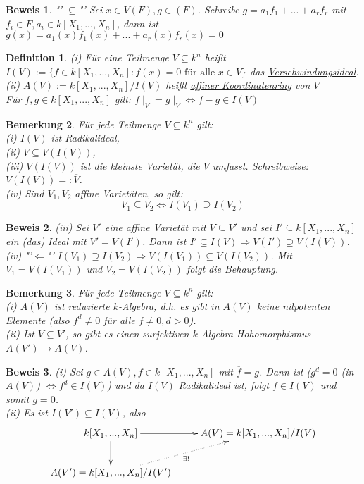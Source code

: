 \documentclass[a4paper,12pt]{report}
\theoremstyle{break}
\newtheorem{Def}{Definition}[chapter]
\newtheorem{Bem}[Def]{Bemerkung}
\theoremstyle{nonumberbreak}
\newtheorem{Bew}{Beweis}
\theoremstyle{nonumberplain}
\begin{document}
\begin{Bew}
"' $\subseteq$"' Sei $x\in V(F), g\in (F)$. Schreibe $g=a_1f_1+...+a_rf_r$ mit $f_i \in F, a_i \in k[X_1,...,X_n]$, dann ist $g(x)=a_1(x)f_1(x)+...+a_r(x)f_r(x)=0$
\end{Bew}
\begin{Def}
(i) Für eine Teilmenge $V\subseteq k^n$ heißt
$I(V):=\{f\in k[X_1,...,X_n]: f(x)=0 \text{ für alle } x \in V\}$
das \underline{Verschwindungsideal}.\\
(ii) $A(V):= k[X_1,...,X_n]/I(V)$ heißt \underline{affiner Koordinatenring} von $V$\\
Für $f,g\in k[X_1,...,X_n]$ gilt: $f\mid_V = g\mid_V\Leftrightarrow f-g \in I(V)$
\end{Def}
\begin{Bem}
Für jede Teilmenge $V\subseteq k^n$ gilt:\\
(i) $I(V)$ ist Radikalideal,\\
(ii) $V\subseteq V(I(V))$,\\
(iii) $V(I(V))$ ist die kleinste Varietät, die $V$ umfasst. Schreibweise: $V(I(V))=: \overline{V}$.\\
(iv) Sind $V_1, V_2$ affine Varietäten, so gilt:
$$V_1\subseteq V_2 \Leftrightarrow I(V_1)\supseteq I(V_2)$$
\end{Bem}
\begin{Bew}
(iii) Sei $V'$ eine affine Varietät mit $V\subseteq V'$ und sei $I'\subseteq k[X_1,...,X_n]$ ein (das) Ideal mit $V'=V(I')$. Dann ist $I'\subseteq I(V)\Rightarrow V(I')\supseteq V(I(V))$.\\
(iv) "'$\Leftarrow$"' $I(V_1)\supseteq I(V_2)\Rightarrow V(I(V_1))\subseteq V(I(V_2))$. Mit $V_1 = V(I(V_1))$ und $V_2= V(I(V_2))$ folgt die Behauptung.
\end{Bew}
\begin{Bem}
Für jede Teilmenge $V\subseteq k^n$ gilt:\\
(i) $A(V)$ ist reduzierte $k$-Algebra, d.h. es gibt in $A(V)$ keine nilpotenten Elemente (also $f^d\neq 0$ für alle $f \neq 0, d>0$).\\
(ii) Ist $V\subseteq V'$, so gibt es einen surjektiven $k$-Algebra-Hohomorphismus $A(V')\longrightarrow A(V)$.
\end{Bem}
\begin{Bew}
(i) Sei $g\in A(V), f\in k[X_1,...,X_n]$ mit $\overline{f}=g$. Dann ist ($g^d=0$ (in $A(V)$) $\Leftrightarrow f^d\in I(V)$) und da $I(V)$ Radikalideal ist, folgt $f\in I(V)$ und somit $g=0$.\\
(ii) Es ist $I(V')\subseteq I(V)$, also 
\[
\begin{xy}
\xymatrix{
k[X_1,...,X_n]\ar[r]\ar[d]&A(V)=k[X_1,...,X_n]/I(V) \\
A(V')=k[X_1,...,X_n]/I(V')\ar@{.>}[ur]_{\exists !}&
}
\end{xy}
\]
\end{Bew}
\end{document}
